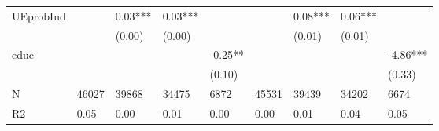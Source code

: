 \documentclass{report}
\begin{document}
\begin{table}
\begin{tabular}{lllllllll}
UEprobInd          &           &    0.03*** &     0.03*** &              &            &     0.08*** &      0.06*** &               \\
                   &           &     (0.00) &      (0.00) &              &            &      (0.01) &       (0.01) &               \\
educ               &           &            &             &      -0.25** &            &             &              &      -4.86*** \\
                   &           &            &             &       (0.10) &            &             &              &        (0.33) \\
N                  &     46027 &      39868 &       34475 &         6872 &      45531 &       39439 &        34202 &          6674 \\
R2                 &      0.05 &       0.00 &        0.01 &         0.00 &       0.00 &        0.01 &         0.04 &          0.05 \\
\bottomrule
\end{tabular}
\end{table}
\end{document}
